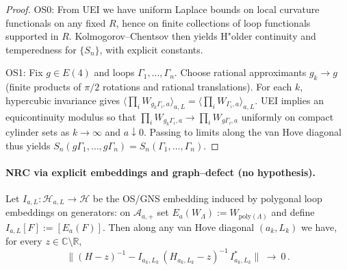 \documentclass[11pt]{amsart}
\begin{document}
\begin{proof}
OS0: From UEI we have uniform Laplace bounds on local curvature functionals on any fixed $R$, hence on finite collections of loop functionals supported in $R$. Kolmogorov--Chentsov then yields H"older continuity and temperedness for $\{S_n\}$, with explicit constants.

OS1: Fix $g\in E(4)$ and loops $\Gamma_1,\dots,\Gamma_n$. Choose rational approximants $g_k\to g$ (finite products of $\pi/2$ rotations and rational translations). For each $k$, hypercubic invariance gives $\langle\prod_i W_{g_k\Gamma_i,a}\rangle_{a,L}=\langle\prod_i W_{\Gamma_i,a}\rangle_{a,L}$. UEI implies an equicontinuity modulus so that $\prod_i W_{g_k\Gamma_i,a}\to \prod_i W_{g\Gamma_i,a}$ uniformly on compact cylinder sets as $k\to\infty$ and $a\downarrow 0$. Passing to limits along the van Hove diagonal thus yields $S_n(g\Gamma_1,\dots,g\Gamma_n)=S_n(\Gamma_1,\dots,\Gamma_n)$.
\end{proof}

\paragraph{NRC via explicit embeddings and graph–defect (no hypothesis).}
\begin{theorem}\label{thm:nrc-explicit}
Let $I_{a,L}:\mathcal H_{a,L}\to\mathcal H$ be the OS/GNS embedding induced by polygonal loop embeddings on generators: on $\mathcal A_{a,+}$ set $E_a(W_\Lambda):=W_{\mathrm{poly}(\Lambda)}$ and define $I_{a,L}[F]:=[E_a(F)]$. Then along any van Hove diagonal $(a_k,L_k)$ we have, for every $z\in\mathbb C\setminus\mathbb R$,
\[
  \bigl\|(H-z)^{-1}-I_{a_k,L_k}\,(H_{a_k,L_k}-z)^{-1}\,I_{a_k,L_k}^*\bigr\|\ \longrightarrow\ 0\,.
\]
\end{theorem}
\end{document}

